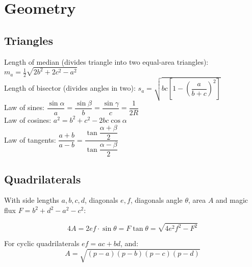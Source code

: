 \section{Geometry}

\subsection{Triangles}

\small
Length of median (divides triangle into two equal-area triangles): $m_a=\tfrac{1}{2}\sqrt{2b^2+2c^2-a^2}$\\
Length of bisector (divides angles in two): $s_a=\sqrt{bc\left[1-\left(\dfrac{a}{b+c}\right)^2\right]}$\\
Law of sines: $\dfrac{\sin\alpha}{a}=\dfrac{\sin\beta}{b}=\dfrac{\sin\gamma}{c}=\dfrac{1}{2R}$\\
Law of cosines: $a^2=b^2+c^2-2bc\cos\alpha$\\
Law of tangents: $\dfrac{a+b}{a-b}=\dfrac{\tan\dfrac{\alpha+\beta}{2}}{\tan\dfrac{\alpha-\beta}{2}}$\\

\subsection{Quadrilaterals}
With side lengths $a,b,c,d$, diagonals $e, f$, diagonals angle $\theta$, area $A$ and
magic flux $F=b^2+d^2-a^2-c^2$:

\[ 4A = 2ef \cdot \sin\theta = F\tan\theta = \sqrt{4e^2f^2-F^2} \]

For cyclic quadrilaterals
$ef = ac + bd$, and:
\[ A = \sqrt{(p-a)(p-b)(p-c)(p-d)} \]

